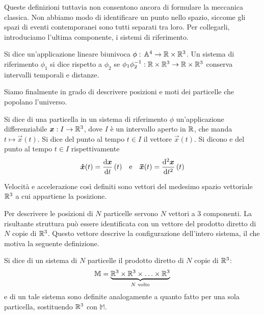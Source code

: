 Queste definizioni tuttavia non consentono ancora di formulare la meccanica classica. Non abbiamo modo di identificare un punto nello spazio, siccome gli spazi di eventi contemporanei sono tutti separati tra loro. Per collegarli, introduciamo l'ultima componente, i sistemi di riferimento.
\begin{definition}
  Si dice  un'applicazione lineare biunivoca $\phi:\, \mathbb{A}^4 \to \mathbb{R}\times \mathbb{R}^3$. Un sistema di riferimento $\phi_1$ si dice  rispetto a $\phi_2$ se $\phi_1 \phi_2^{-1}: \mathbb{R}\times \mathbb{R}^3\to \mathbb{R}\times \mathbb{R}^3$ conserva intervalli temporali e distanze.
\end{definition}

Siamo finalmente in grado di descrivere posizioni e moti dei particelle che popolano l'universo.
\begin{definition}
  Si dice  di una particella in un sistema di riferimento $\phi$ un'applicazione differenziabile $\boldsymbol{x}:I \to \mathbb{R}^3$, dove $I$ è un intervallo aperto in $\mathbb{R}$, che manda $t\mapsto \vec{x}(t)$. Si dice  del punto al tempo $t \in I$ il vettore $\vec{x}(t)$. Si dicono  e  del punto al tempo $t \in I$ rispettivamente \begin{equation}
  \vec{\dot{x}} (t) = \dv{\vec{x}}{t}\, (t) \qqtext{e} \vec{\ddot{x}} (t) = \dv[2]{\vec{x}}{t}\, (t)
  \end{equation} 
\end{definition}
\begin{remark}
  Velocità e accelerazione così definiti sono vettori del medesimo spazio vettoriale $\mathbb{R}^3$ a cui appartiene la posizione.
\end{remark}

Per descrivere le posizioni di $N$ particelle servono $N$ vettori a 3 componenti. La risultante struttura può essere identificata con un vettore del prodotto diretto di $N$ copie di $\mathbb{R}^3$. Questo vettore descrive la configurazione dell'intero sistema, il che motiva la seguente definizione.
\begin{definition}
  Si dice  di un sistema di $N$ particelle il prodotto diretto di $N$ copie di $\mathbb{R}^3$: \begin{equation}
  \mathbb{M} = \underbrace{\mathbb{R}^3 \times \mathbb{R}^3 \times \ldots \times \mathbb{R}^3}_{N \text{ volte}}
  \end{equation} 
   e  di un tale sistema sono definite analogamente a quanto fatto per una sola particella, sostituendo $\mathbb{R}^3$ con $\mathbb{M}$.
\end{definition}

